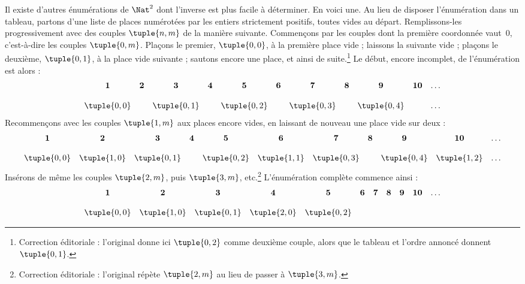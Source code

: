 \documentclass[11pt,a4paper,openany]{memoir}
\begin{document}
\begin{explain}
Il existe d’autres énumérations de $\Nat^2$ dont l’inverse est
plus facile à déterminer. En voici une. Au lieu de disposer
l’énumération dans un tableau, partons d’une liste de places
numérotées par les entiers strictement positifs, toutes vides
au départ. Remplissons-les progressivement avec des couples
$\tuple{n,m}$ de la manière suivante. Commençons par les couples
dont la première coordonnée vaut~$0$, c’est-à-dire les couples
$\tuple{0,m}$. Plaçons le premier, $\tuple{0,0}$, à la première
place vide ; laissons la suivante vide ; plaçons le deuxième,
$\tuple{0,1}$, à la place vide suivante ; sautons encore une
place, et ainsi de suite.\footnote{Correction éditoriale :
l’original donne ici $\tuple{0,2}$ comme deuxième couple,
alors que le tableau et l’ordre annoncé donnent $\tuple{0,1}$.}
Le début, encore incomplet, de l’énumération est alors :
{\small\[
\begin{array}{@{}c c c c c c c c c c c@{}}
\mathbf 1 & \mathbf 2 & \mathbf 3 & \mathbf 4 & \mathbf 5 & \mathbf 6 & \mathbf 7 & \mathbf 8 & \mathbf 9 & \mathbf{10} & \dots \\ \\
\tuple{0,0} &  & \tuple{0,1} &  & \tuple{0,2} &  & \tuple{0,3} & & \tuple{0,4} &  & \dots \\
\end{array}
\]}
Recommençons avec les couples $\tuple{1,m}$ aux places encore
vides, en laissant de nouveau une place vide sur deux :
{\small\[
\begin{array}{@{}c c c c c c c c c c c@{}}
\mathbf 1 & \mathbf 2 & \mathbf 3 & \mathbf 4 & \mathbf 5 & \mathbf 6 & \mathbf 7 & \mathbf 8 & \mathbf 9 & \mathbf{10} & \dots \\ \\
\tuple{0,0} & \tuple{1,0} & \tuple{0,1} &  & \tuple{0,2} & \tuple{1,1} &
\tuple{0,3} & & \tuple{0,4} &  \tuple{1,2} & \dots \\
\end{array}
\]}
Insérons de même les couples $\tuple{2,m}$, puis $\tuple{3,m}$,
etc.\footnote{Correction éditoriale : l’original répète
$\tuple{2,m}$ au lieu de passer à $\tuple{3,m}$.}
L’énumération complète commence ainsi :
{\small\[
\begin{array}{@{}cc c c c c c c c c c@{}}
\mathbf 1 & \mathbf 2 & \mathbf 3 & \mathbf 4 & \mathbf 5 & \mathbf 6 & \mathbf 7 & \mathbf 8 & \mathbf 9 & \mathbf{10} & \dots \\ \\
\tuple{0,0} & \tuple{1,0} & \tuple{0,1} & \tuple{2,0}  & \tuple{0,2} &

\end{array}\]}
\end{explain}
\end{document}
